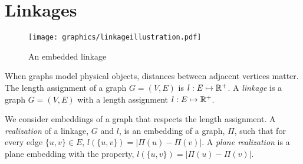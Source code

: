 \section{Linkages}
\begin{figure}[h]
 \begin{center}
  \texttt{[image: graphics/linkageillustration.pdf]}
  \caption{An embedded linkage}
 \end{center}

\end{figure}


When graphs model physical objects, distances between adjacent vertices matter. The length 
assignment of a graph $G=(V,E)$ is $l:E \mapsto {\mathbb{R}}^+$. A \textit{linkage} is a graph $G = 
(V,E)$ with a length assignment $l:E \mapsto {\mathbb{R}}^+$.  

We consider embeddings of a graph that 
respects the length assignment.  A \textit{realization} of a linkage, $G$ and $l$, is an embedding 
of a graph, $\Pi$, such that for every edge $\{u,v\} \in E$, $l\left( \{u,v\} \right) 
= \left\vert \Pi(u) - \Pi(v) \right\vert$.  A \textit{plane realization} is a 
plane embedding with the property, $l\left( \{u,v\} \right) 
= \left\vert \Pi(u) - \Pi(v) \right\vert$.




